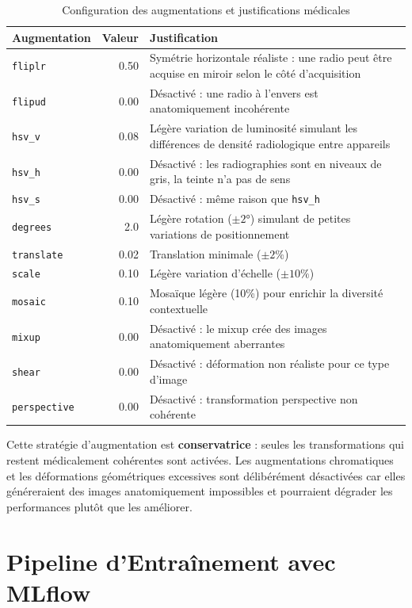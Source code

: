 \documentclass{rapportENSIAS}
\begin{document}
\begin{table}[H]
\centering
\caption{Configuration des augmentations et justifications médicales}
\label{tab:augmentations}
\begin{tabular}{lrp{7.5cm}}
\toprule
\textbf{Augmentation} & \textbf{Valeur} & \textbf{Justification} \\
\midrule
\texttt{fliplr}     & 0.50
  & Symétrie horizontale réaliste : une radio peut être acquise en miroir
    selon le côté d'acquisition \\
\texttt{flipud}     & 0.00
  & Désactivé : une radio à l'envers est anatomiquement incohérente \\
\texttt{hsv\_v}     & 0.08
  & Légère variation de luminosité simulant les différences de densité
    radiologique entre appareils \\
\texttt{hsv\_h}     & 0.00
  & Désactivé : les radiographies sont en niveaux de gris,
    la teinte n'a pas de sens \\
\texttt{hsv\_s}     & 0.00
  & Désactivé : même raison que \texttt{hsv\_h} \\
\texttt{degrees}    & 2.0
  & Légère rotation ($\pm 2°$) simulant de petites variations de positionnement \\
\texttt{translate}  & 0.02
  & Translation minimale ($\pm 2\%$) \\
\texttt{scale}      & 0.10
  & Légère variation d'échelle ($\pm 10\%$) \\
\texttt{mosaic}     & 0.10
  & Mosaïque légère (10\%) pour enrichir la diversité contextuelle \\
\texttt{mixup}      & 0.00
  & Désactivé : le mixup crée des images anatomiquement aberrantes \\
\texttt{shear}      & 0.00
  & Désactivé : déformation non réaliste pour ce type d'image \\
\texttt{perspective}& 0.00
  & Désactivé : transformation perspective non cohérente \\
\bottomrule
\end{tabular}
\end{table}

Cette stratégie d'augmentation est \textbf{conservatrice} : seules les
transformations qui restent médicalement cohérentes sont activées. Les
augmentations chromatiques et les déformations géométriques excessives sont
délibérément désactivées car elles généreraient des images anatomiquement
impossibles et pourraient dégrader les performances plutôt que les améliorer.

\section{Pipeline d'Entraînement avec MLflow}
\end{document}
